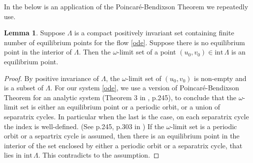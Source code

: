 \documentclass{amsart}
\theoremstyle{definition}
\newtheorem{lemma}[thm1]{Lemma}
\numberwithin{equation}{section}
\def\ii{{\textrm{int}}\,}
\begin{document}
In the below is an application of the Poincar\'e-Bendixson Theorem we repeatedly use.
\begin{lemma} \label{pb} Suppose $\Lambda$ is a compact positively invariant set containing finite number of equilibrium points for the flow  \eqref{ode}. Suppose there is no equilibrium point in the interior of $\Lambda$.
Then the $\omega$-limit set of a point $(u_0,v_0) \in \ii \Lambda$ is an equilibrium point.
\end{lemma}
\begin{proof}
By positive invariance of $\Lambda$, the $\omega$-limit set of $(u_0,v_0)$ is non-empty and is a subset of $\Lambda$. For our system \eqref{ode}, we use a version of Poincar\'e-Bendixson Theorem for an analytic system (Theorem 3 in \cite{perko_differential_2001}, p.245), to conclude that the $\omega$-limit set is either an equilibrium point or a periodic orbit, or a union of separatrix cycles. In particular when the last is the case, on each separatrix cycle the index is well-defined. (See p.245, p.303 in \cite{perko_differential_2001}) If the $\omega$-limit set is a periodic orbit or a separtrix cycle is assumed, then there is an equilibrium point in the interior of the set enclosed by either a periodic orbit or a separatrix cycle, that lies in $\ii \Lambda$. This contradicts to the assumption. 
% 
% 
% 
% 
\end{proof}
\end{document}
